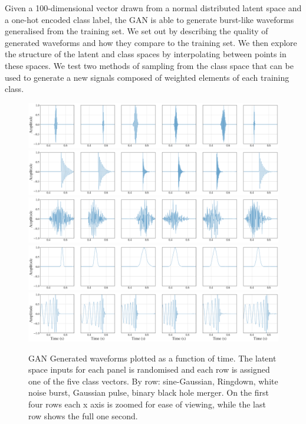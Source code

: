 \documentclass[12pt]{iopart}
\begin{document}
%
Given a 100-dimensional vector drawn from a normal distributed latent space and a one-hot encoded class
label, the GAN is able to generate burst-like waveforms generalised from the
training set. We set out by describing the quality of generated waveforms and
how they compare to the training set. We then explore the structure of the
latent and class spaces by interpolating between points in these spaces. We
test two methods of sampling from the class space that can be used to generate
a new signals composed of weighted elements of each training class.


\begin{figure}
    \centering
    \includegraphics[width=\textwidth]{figures/generations/sg.png}
    \includegraphics[width=\textwidth]{figures/generations/rd.png}
    \includegraphics[width=\textwidth]{figures/generations/wnb.png}
    \includegraphics[width=\textwidth]{figures/generations/blip.png}
    \includegraphics[width=\textwidth]{figures/generations/bbh.png}
    \caption{\ac{GAN} Generated waveforms plotted as a function of time. The latent space inputs for each panel is randomised and each row is assigned one of the five class vectors. By row: sine-Gaussian, Ringdown,
white noise burst, Gaussian pulse, binary black hole merger. On the first four rows each x axis is zoomed for ease of viewing, while the last row shows the full one second.}
\label{fig:gen_signals} 
\end{figure}
\end{document}
